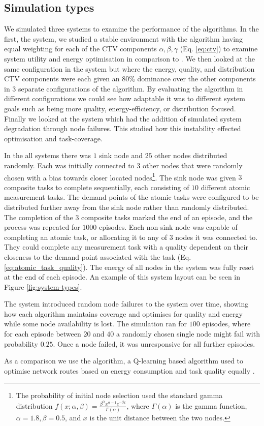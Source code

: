 \subsection{Simulation types}
We simulated three systems to examine the performance of the algorithms. In the first, the \simulationSimple{}{} system,  we studied a stable environment with the \acronymWSNOptimisation{}{} algorithm having
equal weighting for each of the CTV components $\alpha, \beta, \gamma$ (Eq. \ref{eq:ctv}) to examine system utility and energy optimisation in comparison to \acronymQRouting{}{}.  We then looked at the same configuration in the \simulationExtended{}{} system but where the energy, quality, and distribution CTV components were each given an $80\%$ dominance over the other components in $3$ separate configurations of the algorithm. By evaluating the algorithm in different configurations we could see how adaptable it was to different system goals such as being more quality, energy-efficiency, or distribution focused. Finally we looked at the \simulationNodeFailure{}{} system which had the addition of simulated system degradation through node failures. This studied how this instability effected optimisation and task-coverage.  

In the all systems there was  $1$ sink node and $25$ other nodes distributed randomly. Each was initially connected to $3$ other nodes that were randomly chosen with a bias towards closer located nodes\footnote{
		The probability of initial node selection used the standard gamma distribution $f(x; \alpha, \beta) = \frac{\beta^{\alpha} x^{\alpha-1}e^{- \beta x}}   {\Gamma(\alpha)}$, where $\Gamma(\alpha)$ is the  gamma function, $\alpha=1.8, \beta=0.5$, and $x$ is the unit distance between the two nodes.
	}. 
The sink node was given $3$ composite tasks to complete sequentially, each consisting of $10$ different atomic measurement tasks. The demand points of the atomic tasks were configured to be distributed further away from the sink node rather than randomly distributed. The completion of the $3$ composite tasks marked the end of an episode, and the process was repeated for $1000$ episodes. Each non-sink node was capable of completing an atomic task, or allocating it to any of $3$ nodes it was connected to. They could complete any measurement task with a quality dependent on their closeness to the demand point associated with the task (Eq. \ref{eq:atomic_task_quality}). The energy of all nodes in the system was fully reset at the end of each episode. An example of this system layout can be seen in Figure \ref{fig:system-types}. 

The \simulationNodeFailure{}{} system introduced random node failures to the system over time, showing how each algorithm maintains coverage and optimises for quality and energy while some node availability is lost. The simulation ran for $100$ episodes, where for each episode between $20$ and $40$  a randomly chosen single node might fail with probability $0.25$. Once a node failed, it was unresponsive for all further episodes. 

 As a comparison we use the \acronymQRouting{}{} algorithm, a Q-learning based algorithm  used to optimise network routes based on energy consumption and task quality equally \citep{XXX, XXX}.